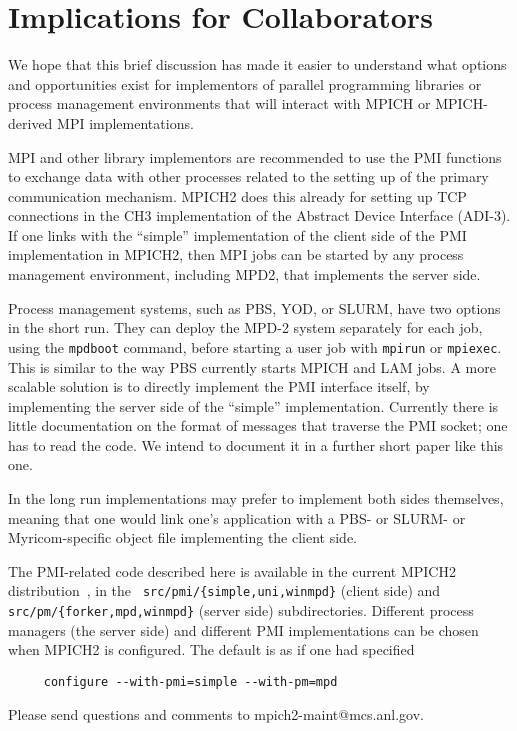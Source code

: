 \documentclass[11pt]{article}
\begin{document}
\section{Implications for Collaborators}
\label{sec:implications}

We hope that this brief discussion has made it easier to understand what
options and opportunities exist for implementors of parallel programming
libraries or process management environments that will interact with
MPICH or MPICH-derived MPI implementations.

MPI and other library implementors are recommended to use the PMI
functions to exchange data with other processes related to the setting
up of the primary communication mechanism.  MPICH2 does this already for
setting up TCP connections in the CH3 implementation of the Abstract
Device Interface (ADI-3).  If one links with the ``simple''
implementation of the client side of the PMI implementation in MPICH2,
then MPI jobs can be started by any process management environment,
including MPD2, that implements the server side.

Process management systems, such as PBS, YOD, or SLURM, have two options
in the short run.  They can deploy the MPD-2 system separately for each
job, using the {\tt mpdboot} command, before starting a user job with
{\tt mpirun} or {\tt mpiexec}.  This is similar to the way PBS currently
starts MPICH and LAM jobs.  A more scalable solution is to directly
implement the PMI interface itself, by implementing the server side of
the ``simple'' implementation.  Currently there is little
documentation on the format of messages that traverse the PMI socket;
one has to read the code.  We intend to document it in a further short paper
like this one.

In the long run implementations may prefer to implement both sides
themselves, meaning that one would link one's application with a PBS- or
SLURM- or Myricom-specific object file implementing the client side.

The PMI-related code described here is available in the current MPICH2
distribution~\cite{mpich2-web-page}, in the {\tt
  src/pmi/\{simple,uni,winmpd\}} (client side) and {\tt
  src/pm/\{forker,mpd,winmpd\}} (server side) subdirectories.
Different process managers (the server side) and different PMI
implementations can be chosen when MPICH2 is configured.  The default is
as if one had specified
\begin{verbatim}
     configure --with-pmi=simple --with-pm=mpd
\end{verbatim}
Please send questions and comments to mpich2-maint@mcs.anl.gov.




\end{document}
